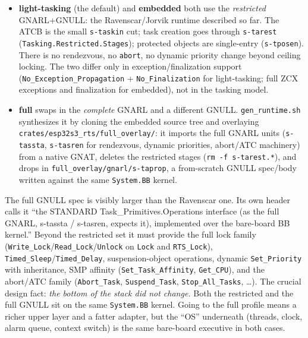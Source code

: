 \begin{itemize}
  \item \textbf{light-tasking} (the default) and \textbf{embedded} both use the
        \emph{restricted} GNARL+GNULL: the Ravenscar/Jorvik runtime described
        so far. The ATCB is the small \texttt{s-taskin} cut; task creation goes
        through \texttt{s-tarest} (\texttt{Tasking.Restricted.Stages}); protected
        objects are single-entry (\texttt{s-tposen}). There is no rendezvous, no
        \texttt{abort}, no dynamic priority change beyond ceiling locking. The
        two differ only in exception/finalization support
        (\texttt{No\_Exception\_Propagation} + \texttt{No\_Finalization} for
        light-tasking; full ZCX exceptions and finalization for embedded), not
        in the tasking model.
  \item \textbf{full} swaps in the \emph{complete} GNARL and a different GNULL.
        \texttt{gen\_runtime.sh} synthesizes it by cloning the embedded source
        tree and overlaying \texttt{crates/esp32s3\_rts/full\_overlay/}: it
        imports the full GNARL units (\texttt{s-tassta}, \texttt{s-tasren} for
        rendezvous, dynamic priorities, abort/ATC machinery) from a native GNAT,
        deletes the restricted stages (\texttt{rm -f s-tarest.*}), and drops in
        \texttt{full\_overlay/gnarl/s-taprop}, a from-scratch GNULL spec/body
        written against the same \texttt{System.BB} kernel.
\end{itemize}

The full GNULL spec is visibly larger than the Ravenscar one. Its own header
calls it ``the STANDARD Task\_Primitives.Operations interface (as the full GNARL,
s-tassta / s-tasren, expects it), implemented over the bare-board BB
kernel.'' Beyond the restricted set it must provide the full lock family
(\texttt{Write\_Lock}/\texttt{Read\_Lock}/\texttt{Unlock} on \texttt{Lock} and
\texttt{RTS\_Lock}), \texttt{Timed\_Sleep}/\texttt{Timed\_Delay},
suspension-object operations, dynamic \texttt{Set\_Priority} with inheritance,
SMP affinity (\texttt{Set\_Task\_Affinity}, \texttt{Get\_CPU}), and the abort/ATC
family (\texttt{Abort\_Task}, \texttt{Suspend\_Task}, \texttt{Stop\_All\_Tasks},
\dots). The crucial design fact: \emph{the bottom of the stack did not change.}
Both the restricted and the full GNULL sit on the same \texttt{System.BB}
kernel. Going to the full profile means a richer upper layer and a fatter
adapter, but the ``OS'' underneath (threads, clock, alarm queue, context
switch) is the same bare-board executive in both cases.

